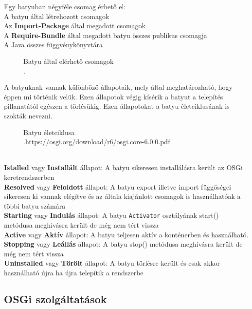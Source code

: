 Egy batyuban négyféle csomag érhető el:
\\A batyu által létrehozott csomagok
\\Az \textbf{Import-Package} által megadott csomagok
\\A \textbf{Require-Bundle} által megadott batyu összes publikus csomagja
\\A Java összes függvénykönyvtára
\\
\begin{figure}[h]
  \centering
  \caption[Batyuk elerese]%
  {Batyu által elérhető csomagok\\
  {\white .}\hfill\url{}}
  \label{fig:BatyukElerese}
\end{figure}
 A batyuknak vannak különböző állapotaik, mely által meghatározható, hogy éppen mi történik velük. Ezen állapotok végig kísérik a batyut a telepítés pillanatától egészen a törlésükig. Ezen állapotokat a batyu életciklusának is szokták nevezni.
\\
\begin{figure}[h]
  \centering
  \caption[Batyuk eletciklusa]%
  {Batyu életciklusa\\
  {\white .}\hfill\url{https://osgi.org/download/r6/osgi.core-6.0.0.pdf}}
  \label{fig:BatyukEletciklusa}
\end{figure}
\\\textbf{Istalled} vagy \textbf{Installált} állapot: A batyu sikeresen installálásra került az OSGi keretrendszerben
\\\textbf{Resolved} vagy \textbf{Feloldott} állapot: A batyu export illetve import függőségei sikeresen ki vannak elégítve és az általa kiajánlott csomagok is használhatóak a többi batyu számára
\\\textbf{Starting} vagy \textbf{Indulás} állapot: A batyu \texttt{Activator} osztályának start() metódusa meghívásra került de még nem tért vissza
\\\textbf{Active} vagy \textbf{Aktív} állapot: A batyu teljesen aktív a konténerben és használható.
\\\textbf{Stopping} vagy \textbf{Leállás} állapot: A batyu stop() metódusa meghívásra került de még nem tért vissza
\\\textbf{Uninstalled} vagy \textbf{Törölt} állapot: A batyu törlésre került és csak akkor használható újra ha újra telepítik a rendszerbe
\\

\subsection{OSGi szolgáltatások}

